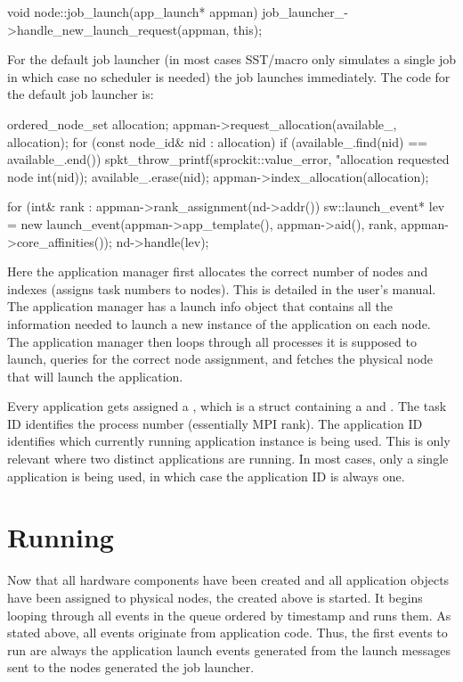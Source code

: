 \begin{enumerate}
\begin{CppCode}
void
node::job_launch(app_launch* appman)
{
  job_launcher_->handle_new_launch_request(appman, this);
}
\end{CppCode}
For the default job launcher (in most cases SST/macro only simulates a single job in which case no scheduler is needed) the job launches immediately. 
The code for the default job launcher is:

\begin{CppCode}
ordered_node_set allocation;
appman->request_allocation(available_, allocation);
for (const node_id& nid : allocation){
  if (available_.find(nid) == available_.end()){
    spkt_throw_printf(sprockit::value_error,
                      "allocation requested node %
                      int(nid));
  }
  available_.erase(nid);
}
appman->index_allocation(allocation);

for (int& rank : appman->rank_assignment(nd->addr()){
  sw::launch_event* lev = new launch_event(appman->app_template(), appman->aid(),
                                             rank, appman->core_affinities());
  nd->handle(lev);
}
\end{CppCode}
Here the application manager first allocates the correct number of nodes and indexes (assigns task numbers to nodes).
This is detailed in the user's manual.
The application manager has a launch info object that contains all the information needed to launch a new instance of the application on each node.
The application manager then loops through all processes it is supposed to launch,
queries for the correct node assignment,
and fetches the physical node that will launch the application.

Every application gets assigned a , which is a struct containing a  and .
The task ID identifies the process number (essentially MPI rank). 
The application ID identifies which currently running application instance is being used.
This is only relevant where two distinct applications are running.
In most cases, only a single application is being used, in which case the application ID is always one.


\section{Running}\label{sec:running}
Now that all hardware components have been created and all application objects have been assigned to physical nodes,
the  created above is started.
It begins looping through all events in the queue ordered by timestamp and runs them.
As stated above, all events originate from application code.
Thus, the first events to run are always the application launch events generated from the launch messages sent to the nodes generated the job launcher.

\end{enumerate}
